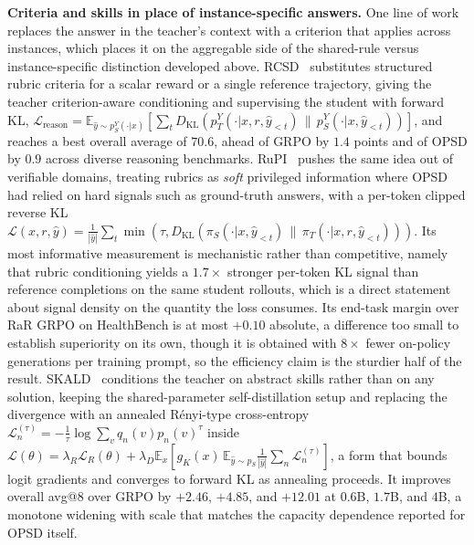 \documentclass{article} %
\newcommand{\E}{\mathbb{E}}
\newcommand{\KL}{D_{\mathrm{KL}}}
\newcommand{\loss}{\mathcal{L}}
\begin{document}
\textbf{Criteria and skills in place of instance-specific answers.} One line of work replaces the answer in the teacher's context with a criterion that applies across instances, which places it on the aggregable side of the shared-rule versus instance-specific distinction developed above. RCSD~\citep{2606.19327} substitutes structured rubric criteria for a scalar reward or a single reference trajectory, giving the teacher criterion-aware conditioning and supervising the student with forward KL, $\loss_{\text{reason}} = \E_{\hat{y} \sim p^Y_S(\cdot|x)}[\sum_t \KL(p^Y_T(\cdot|x, r, \hat{y}_{<t}) \,\|\, p^Y_S(\cdot|x, \hat{y}_{<t}))]$, and reaches a best overall average of $70.6$, ahead of GRPO by $1.4$ points and of OPSD by $0.9$ across diverse reasoning benchmarks. RuPI~\citep{2608.02948} pushes the same idea out of verifiable domains, treating rubrics as \emph{soft} privileged information where OPSD had relied on hard signals such as ground-truth answers, with a per-token clipped reverse KL $\loss(x, r, \hat{y}) = \frac{1}{|\hat{y}|}\sum_t \min(\tau, \KL(\pi_S(\cdot|x, \hat{y}_{<t}) \,\|\, \pi_T(\cdot|x, r, \hat{y}_{<t})))$. Its most informative measurement is mechanistic rather than competitive, namely that rubric conditioning yields a $1.7\times$ stronger per-token KL signal than reference completions on the same student rollouts, which is a direct statement about signal density on the quantity the loss consumes. Its end-task margin over RaR GRPO on HealthBench is at most $+0.10$ absolute, a difference too small to establish superiority on its own, though it is obtained with $8\times$ fewer on-policy generations per training prompt, so the efficiency claim is the sturdier half of the result. SKALD~\citep{2608.09826} conditions the teacher on abstract skills rather than on any solution, keeping the shared-parameter self-distillation setup and replacing the divergence with an annealed R\'enyi-type cross-entropy $\loss^{(\tau)}_n = -\frac{1}{\tau}\log\sum_v q_n(v) p_n(v)^\tau$ inside $\loss(\theta) = \lambda_R \loss_R(\theta) + \lambda_D \E_x[g_K(x)\, \E_{\hat{y} \sim p_S} \frac{1}{|\hat{y}|}\sum_n \loss^{(\tau)}_n]$, a form that bounds logit gradients and converges to forward KL as annealing proceeds. It improves overall avg@8 over GRPO by $+2.46$, $+4.85$, and $+12.01$ at $0.6$B, $1.7$B, and $4$B, a monotone widening with scale that matches the capacity dependence reported for OPSD itself.
\end{document}
